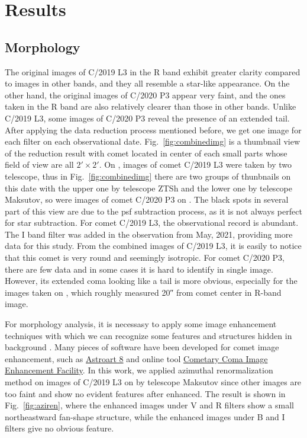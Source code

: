 \section{Results} \label{sec:res}

\subsection{Morphology}

The original images of C/2019 L3 in the R band exhibit greater clarity compared to images in other bands, and they all resemble a star-like appearance. On the other hand, the original images of C/2020 P3 appear very faint, and the ones taken in the R band are also relatively clearer than those in other bands. Unlike C/2019 L3, some images of C/2020 P3 reveal the presence of an extended tail. After applying the data reduction process mentioned before, we get one image for each filter on each observational date. Fig.~\ref{fig:combinedimg} is a thumbnail view of the reduction result with comet located in center of each small parts whose field of view are all $\ang{;2;} \times \ang{;2;}$. On , images of comet C/2019 L3 were taken by two telescope, thus in Fig.~\ref{fig:combinedimg} there are two groups of thunbnails on this date with the upper one by telescope ZTSh and the lower one by telescope Maksutov, so were images of comet C/2020 P3 on . The black spots in several part of this view are due to the psf subtraction process, as it is not always perfect for star subtraction. For comet C/2019 L3, the observational record is abundant. The I band filter was added in the observation from May, 2021, providing more data for this study. From the combined images of C/2019 L3, it is easily to notice that this comet is very round and seemingly isotropic. For comet C/2020 P3, there are few data and in some cases it is hard to identify in single image. However, its extended coma looking like a tail is more obvious, especially for the images taken on , which roughly measured \ang{;;20} from comet center in R-band image. 

For morphology analysis, it is necessasy to apply some image enhancement techniques with which we can recognize some features and structures hidden in background \citep{samarasinha_image_2014}. Many pieces of software have been developed for comet image enhancement, such as {\href{https://www.msb-astroart.com/down_en.htm}{Astroart 8}} and online tool {\href{https://www.psi.edu/research/cometimen}{Cometary Coma Image Enhancement Facility}}. In this work, 
we applied azimuthal renormalization method on images of C/2019 L3 on  by telescope Maksutov since other images are too faint and show no evident features after enhanced. The result is shown in Fig.~\ref{fig:aziren}, where the enhanced images under V and R filters show a small northeastward fan-shape structure, while the enhanced images under B and I filters give no obvious feature.  

